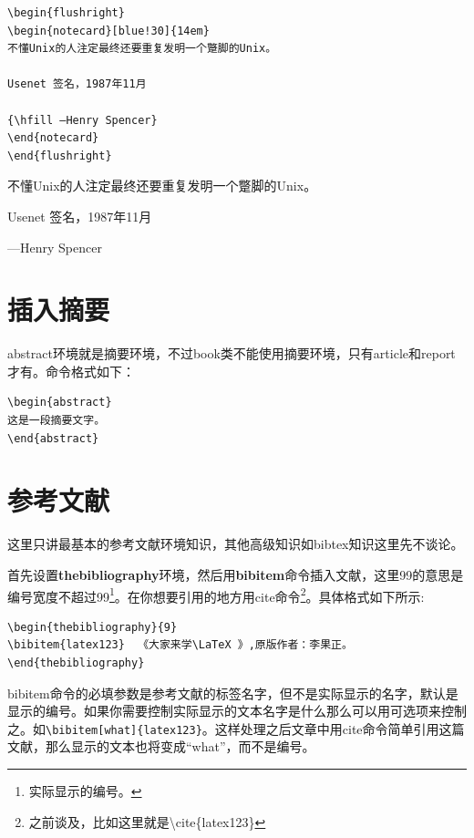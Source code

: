 \documentclass[11pt,oneside]{book}
\begin{document}
\begin{Verbatim}
\begin{flushright}
\begin{notecard}[blue!30]{14em}
不懂Unix的人注定最终还要重复发明一个蹩脚的Unix。

Usenet 签名，1987年11月

{\hfill —Henry Spencer}
\end{notecard}
\end{flushright}
\end{Verbatim}

\begin{flushright}
\begin{notecard}[blue!30]{14em}
不懂Unix的人注定最终还要重复发明一个蹩脚的Unix。

Usenet 签名，1987年11月

{\hfill —Henry Spencer}
\end{notecard}
\end{flushright}



\chapter{插入摘要}
abstract环境就是摘要环境，不过book类不能使用摘要环境，只有article和report才有。命令格式如下：
\begin{Verbatim}
\begin{abstract}
这是一段摘要文字。
\end{abstract}
\end{Verbatim}



\chapter{参考文献}
这里只讲最基本的参考文献环境知识，其他高级知识如bibtex知识这里先不谈论。

首先设置\textbf{thebibliography}环境，然后用\textbf{bibitem}命令插入文献，这里99的意思是编号宽度不超过99\footnote{实际显示的编号。}。在你想要引用的地方用cite命令\footnote{之前谈及，比如这里就是\textbackslash cite\{latex123\}}。具体格式如下所示:

\begin{Verbatim}
\begin{thebibliography}{9}
\bibitem{latex123}  《大家来学\LaTeX 》,原版作者：李果正。
\end{thebibliography}
\end{Verbatim}

bibitem命令的必填参数是参考文献的标签名字，但不是实际显示的名字，默认是显示的编号。如果你需要控制实际显示的文本名字是什么那么可以用可选项来控制之。如\verb+\bibitem[what]{latex123}+。这样处理之后文章中用cite命令简单引用这篇文献，那么显示的文本也将变成“what”，而不是编号。
\end{document}

